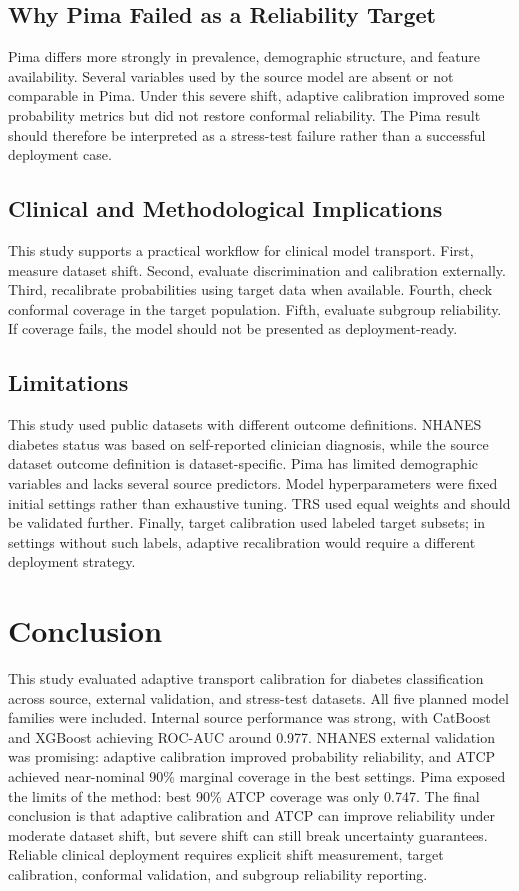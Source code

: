 \documentclass[11pt]{article}
\begin{document}
\subsection{Why Pima Failed as a Reliability Target}
Pima differs more strongly in prevalence, demographic structure, and feature availability. Several variables used by the source model are absent or not comparable in Pima. Under this severe shift, adaptive calibration improved some probability metrics but did not restore conformal reliability. The Pima result should therefore be interpreted as a stress-test failure rather than a successful deployment case.

\subsection{Clinical and Methodological Implications}
This study supports a practical workflow for clinical model transport. First, measure dataset shift. Second, evaluate discrimination and calibration externally. Third, recalibrate probabilities using target data when available. Fourth, check conformal coverage in the target population. Fifth, evaluate subgroup reliability. If coverage fails, the model should not be presented as deployment-ready.

\subsection{Limitations}
This study used public datasets with different outcome definitions. NHANES diabetes status was based on self-reported clinician diagnosis, while the source dataset outcome definition is dataset-specific. Pima has limited demographic variables and lacks several source predictors. Model hyperparameters were fixed initial settings rather than exhaustive tuning. TRS used equal weights and should be validated further. Finally, target calibration used labeled target subsets; in settings without such labels, adaptive recalibration would require a different deployment strategy.

\section{Conclusion}
This study evaluated adaptive transport calibration for diabetes classification across source, external validation, and stress-test datasets. All five planned model families were included. Internal source performance was strong, with CatBoost and XGBoost achieving ROC-AUC around 0.977. NHANES external validation was promising: adaptive calibration improved probability reliability, and ATCP achieved near-nominal 90\% marginal coverage in the best settings. Pima exposed the limits of the method: best 90\% ATCP coverage was only 0.747. The final conclusion is that adaptive calibration and ATCP can improve reliability under moderate dataset shift, but severe shift can still break uncertainty guarantees. Reliable clinical deployment requires explicit shift measurement, target calibration, conformal validation, and subgroup reliability reporting.
\end{document}
